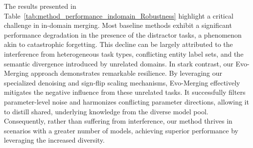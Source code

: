 The results presented in Table~\ref{tab:method_performance_indomain_Robustness} highlight a critical challenge in in-domain merging. Most baseline methods exhibit a significant performance degradation in the presence of the distractor tasks, a phenomenon akin to catastrophic forgetting. This decline can be largely attributed to the interference from heterogeneous task types, conflicting entity label sets, and the semantic divergence introduced by unrelated domains. In stark contrast, our Evo-Merging approach demonstrates remarkable resilience. By leveraging our specialized denoising and sign-flip scaling mechanisms, Evo-Merging effectively mitigates the negative influence from these unrelated tasks. It successfully filters parameter-level noise and harmonizes conflicting parameter directions, allowing it to distill shared, underlying knowledge from the diverse model pool. Consequently, rather than suffering from interference, our method thrives in scenarios with a greater number of models, achieving superior performance by leveraging the increased diversity.


